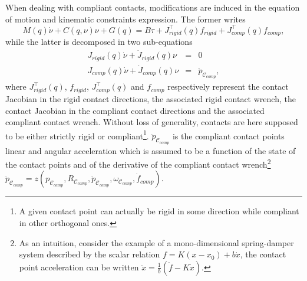 When dealing with compliant contacts, modifications are induced in the equation of motion and kinematic constraints expression. The former writes
\begin{equation}
{M}(q) {\dot{\nu}}+{C}({q},{\nu}){\nu} + G(q) = {B} {\tau} + J^\top_{rigid} (q) f_{rigid} + J^\top_{comp} (q) f_{comp}, \label{eq:compliant dyn model}
\end{equation}
while the latter is decomposed in two sub-equations
\begin{subequations}\label{eq:kin constraints}
\begin{eqnarray}
J_{rigid}(q) \dot\nu + \dot{J}_{rigid}(q) \nu & = & 0 \label{eq:kin constraints rigid}\\  
J_{comp}(q) \dot\nu + \dot{J}_{comp}(q) \nu & = & \ddot{p}_{\mathcal{C}_{comp}}\label{eq:kin constraints comp},%
\end{eqnarray}               
\end{subequations}
where $J^\top_{rigid} (q)$, $f_{rigid}$, $J^\top_{comp} (q)$ and $f_{comp}$ respectively represent the contact Jacobian in the rigid contact directions, the associated rigid contact wrench, the contact Jacobian in the compliant contact directions and the associated compliant contact wrench. Without loss of generality, contacts are here supposed to be either strictly rigid or compliant\footnote{A given contact point can actually be rigid in some direction while compliant in other orthogonal ones.}. $\ddot{p}_{\mathcal{C}_{comp}}$ is the compliant contact points linear and angular acceleration which is assumed to be a function of the state of the contact points and of the derivative of the compliant contact wrench\footnote{As an intuition, consider the example of a mono-dimensional spring-damper system described by the scalar relation $ f = K (x-x_0) + b \dot{x} $, the contact point acceleration can be written $\ddot{x} = \frac{1}{b} ( \dot{f} - K \dot{x})$.} $\ddot{p}_{\mathcal{C}_{comp}} = z\left(p_{\mathcal{C}_{comp}},R_{\mathcal{C}_{comp}},\dot{p}_{\mathcal{C}_{comp}},\omega_{\mathcal{C}_{comp}},\dot{f}_{comp}\right)$.

